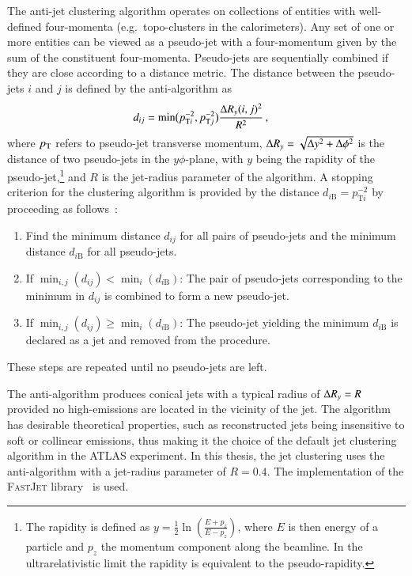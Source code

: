 The anti-\kt jet clustering algorithm operates on collections of entities with
well-defined four-momenta (e.g.\ topo-clusters in the calorimeters). Any set of
one or more entities can be viewed as a pseudo-jet with a four-momentum given by
the sum of the constituent four-momenta. Pseudo-jets are sequentially combined
if they are close according to a distance metric. The distance between the
pseudo-jets $i$ and $j$ is defined by the anti-\kt algorithm
as~\cite{Cacciari:2008gp}
\begin{align*}
  d_{ij} &= \min\bigl( p_{\text{T}i}^{-2}, p_{\text{T}j}^{-2} \bigr)
           \frac{ \Delta R_y(i, j)^2 }{ R^2 } \,\text{,}
\end{align*}
where $p_{\text{T}}$ refers to pseudo-jet transverse momentum,
$\Delta R_y = \sqrt{\Delta y^2 + \Delta \phi^2}$ is the distance of two pseudo-jets in
the $y\phi$-plane, with $y$ being the rapidity of the pseudo-jet,\footnote{The
  rapidity is defined as
  $y = \frac{1}{2} \ln \left( \frac{E + p_z}{E - p_z} \right)$, where $E$ is
  then energy of a particle and $p_z$ the momentum component along the
  beamline. In the ultrarelativistic limit the rapidity is equivalent to the
  pseudo-rapidity.} and $R$ is the jet-radius parameter of the algorithm. A
stopping criterion for the clustering algorithm is provided by the distance
$d_{i\text{B}} = p_{\text{T}i}^{-2}$ by proceeding as
follows~\cite{Cacciari:2008gp}:
\begin{enumerate}
\item Find the minimum distance $d_{ij}$ for all pairs of pseudo-jets and the
  minimum distance $d_{i\text{B}}$ for all pseudo-jets.

\item If $\min_{i,j}(d_{ij}) < \min_{i}(d_{i\text{B}})$: The pair of pseudo-jets
  corresponding to the minimum in $d_{ij}$ is combined to form a new pseudo-jet.

\item If $\min_{i,j}(d_{ij}) \geq \min_{i}(d_{i\text{B}})$: The pseudo-jet
  yielding the minimum $d_{i\text{B}}$ is declared as a jet and removed from the
  procedure.
\end{enumerate}
These steps are repeated until no pseudo-jets are left.

The anti-\kt algorithm produces conical jets with a typical radius of $\Delta R_y = R$
provided no high-\pT emissions are located in the vicinity of the jet. The
algorithm has desirable theoretical properties, such as reconstructed jets being
insensitive to soft or collinear emissions, thus making it the choice of the
default jet clustering algorithm in the ATLAS experiment. In this thesis, the
jet clustering uses the anti-\kt algorithm with a jet-radius parameter of
$R = 0.4$. The implementation of the \textsc{FastJet} library~\cite{Fastjet} is
used.


